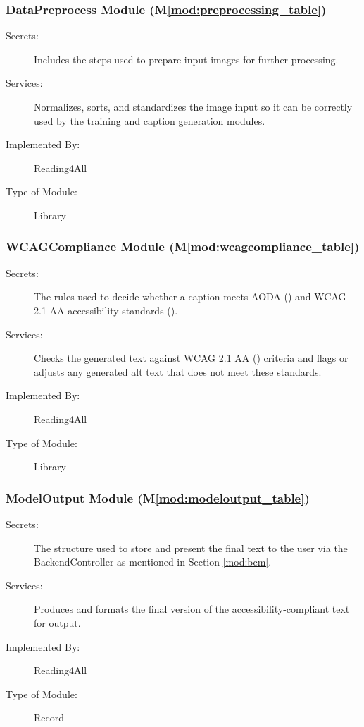 \documentclass[12pt, titlepage]{article}
\newcommand{\mref}[1]{M\ref{#1}}
\begin{document}
\subsubsection{DataPreprocess Module (\mref{mod:preprocessing_table})}
\label{mod:preprocessing}
\begin{description}
  \item[Secrets:] Includes the steps used to prepare input images for
    further processing.
  \item[Services:] Normalizes, sorts, and standardizes the image
    input so it can be correctly used by the training and caption
    generation modules.
  \item[Implemented By:] Reading4All
  \item[Type of Module:] Library
\end{description}

\subsubsection{WCAGCompliance Module (\mref{mod:wcagcompliance_table})}
\label{mod:wcagcompliance}

\begin{description}
  \item[Secrets:] The rules used to decide whether a caption meets
    AODA (\cite{AODA}) and WCAG 2.1 AA accessibility standards (\citet{WCAG}).
  \item[Services:] Checks the generated text against WCAG 2.1 AA (\citet{WCAG})
    criteria and flags or adjusts any generated alt text that does
    not meet these standards.
  \item[Implemented By:] Reading4All
  \item[Type of Module:] Library
\end{description}

\subsubsection{ModelOutput Module (\mref{mod:modeloutput_table})}
\label{mod:modeloutput}

\begin{description}
  \item[Secrets:] The structure used to store and present the final
    text to the user via the BackendController as mentioned in
    Section \ref{mod:bcm}.
  \item[Services:] Produces and formats the final version of the
    accessibility-compliant text for output.
  \item[Implemented By:] Reading4All
  \item[Type of Module:] Record
\end{description}
\end{document}
